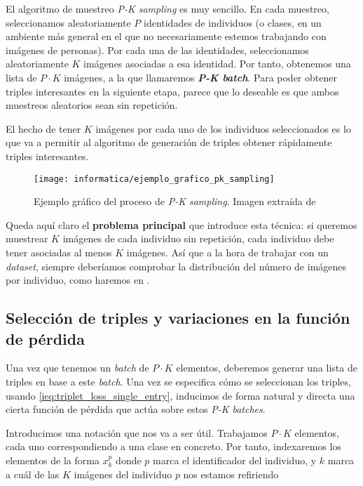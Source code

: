 El algoritmo de muestreo \textit{P-K sampling} es muy sencillo. En cada muestreo, seleccionamos aleatoriamente $P$ identidades de individuos (o clases, en un ambiente más general en el que no necesariamente estemos trabajando con imágenes de personas). Por cada una de las identidades, seleccionamos aleatoriamente $K$ imágenes asociadas a esa identidad. Por tanto, obtenemos una lista de $P \cdot K$ imágenes, a la que llamaremos \textbf{\textit{P-K batch}}. Para poder obtener triples interesantes en la siguiente etapa, parece que lo deseable es que ambos muestreos aleatorios sean sin repetición.

El hecho de tener $K$ imágenes por cada uno de los individuos seleccionados es lo que va a permitir al algoritmo de generación de triples obtener rápidamente triples interesantes.

\begin{figure}[H]
    \centering
    \texttt{[image: informatica/ejemplo\_grafico\_pk\_sampling]}
    \caption{Ejemplo gráfico del proceso de \textit{P-K sampling}. Imagen extraída de \cite{informatica:paper_image_pk_sampling}}
\end{figure}

Queda aquí claro el \textbf{problema principal} que introduce esta técnica: si queremos muestrear $K$ imágenes de cada individuo sin repetición, cada individuo debe tener asociadas al menos $K$ imágenes. Así que a la hora de trabajar con un \textit{dataset}, siempre deberíamos comprobar la distribución del número de imágenes por individuo, como haremos en .

\subsection{Selección de triples y variaciones en la función de pérdida} \label{isubs:seleccion_de_triples}

Una vez que tenemos un \textit{batch} de $P \cdot K$ elementos, deberemos generar una lista de triples en base a este \textit{batch}. Una vez se especifica cómo se seleccionan los triples, usando \eqref{ieq:triplet_loss_single_entry}, inducimos de forma natural y directa una cierta función de pérdida que actúa sobre estos \textit{P-K batches}.

Introducimos una notación que nos va a ser útil. Trabajamos $P \cdot K$ elementos, cada uno correspondiendo a una clase en concreto. Por tanto, indexaremos los elementos de la forma $x_k^p$ donde $p$ marca el identificador del individuo, y $k$ marca a cuál de las $K$ imágenes del individuo $p$ nos estamos refiriendo

